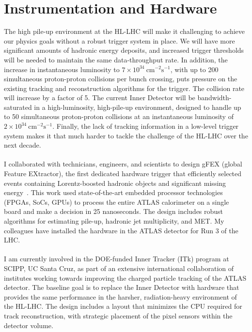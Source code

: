\documentclass[10pt,a4paper,sans]{moderncv} %
\begin{document}
\section{Instrumentation and Hardware}
The high pile-up environment at the HL-LHC will make it challenging to achieve our physics goals without a robust trigger system in place. We will have more significant amounts of hadronic energy deposits, and increased trigger thresholds will be needed to maintain the same data-throughput rate. In addition, the increase in instantaneous luminosity to $7 \times 10^{34}\ \mathrm{cm}^{-2}\mathrm{s}^{-1}$, with up to 200 simultaneous proton-proton collisions per bunch crossing, puts pressure on the existing tracking and reconstruction algorithms for the trigger. The collision rate will increase by a factor of 5. The current Inner Detector will be bandwidth-saturated in a high-luminosity, high-pile-up environment, designed to handle up to 50 simultaneous proton-proton collisions at an instantaneous luminosity of $2 \times 10^{34}\ \mathrm{cm}^{-2}\mathrm{s}^{-1}$. Finally, the lack of tracking information in a low-level trigger system makes it that much harder to tackle the challenge of the HL-LHC over the next decade.
\\
\\
I collaborated with technicians, engineers, and scientists to design gFEX (global Feature EXtractor), the first dedicated hardware trigger that efficiently selected events containing Lorentz-boosted hadronic objects and significant missing energy~\cite{Begel:2233958, Tang:2104248}. This work used state-of-the-art embedded processor technologies (FPGAs, SoCs, GPUs) to process the entire ATLAS calorimeter on a single board and make a decision in 25 nanoseconds. The design includes robust algorithms for estimating pile-up, hadronic jet multiplicity, and MET. My colleagues have installed the hardware in the ATLAS detector for Run 3 of the LHC.
\\
\\
I am currently involved in the DOE-funded Inner Tracker (ITk) program at SCIPP, UC Santa Cruz, as part of an extensive international collaboration of institutes working towards improving the charged particle tracking of the ATLAS detector. The baseline goal is to replace the Inner Detector with hardware that provides the same performance in the harsher, radiation-heavy environment of the HL-LHC. The design includes a layout that minimizes the CPU required for track reconstruction, with strategic placement of the pixel sensors within the detector volume.
\end{document}

